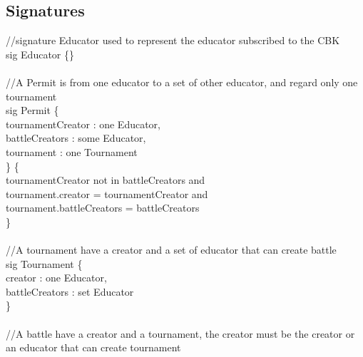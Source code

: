 \documentclass{article}
\begin{document}
{\newpage
\pagestyle{EffortSpentStyle}


\subsection{Signatures}
\color{gray}
//signature Educator used to represent the educator subscribed to the CBK  \\
\color{blue}
sig
\color{black}
Educator  \{\} \\
\\
\color{gray}
//A Permit is from one educator to a set of other educator, and regard only one tournament\\
\color{blue}
sig
\color{black}
Permit \{\\
\-\hspace{1cm}    tournamentCreator : \color{blue} one \color{black} Educator,\\
\-\hspace{1cm}    battleCreators : \color{blue} some \color{black} Educator,\\
\-\hspace{1cm}    tournament : \color{blue} one \color{black} Tournament\\
\}	\{\\
\-\hspace{1cm}    tournamentCreator \color{blue} not in \color{black} battleCreators \color{blue} and \color{black}\\
\-\hspace{1cm}    tournament.creator \color{blue} = \color{black} tournamentCreator \color{blue} and \color{black}\\
\-\hspace{1cm}    tournament.battleCreators \color{blue} = \color{black} battleCreators\\
\}\\
\\
\color{gray}
//A tournament have a creator and a set of educator that can create battle\\
\color{blue}
sig
\color{black}
Tournament \{ \\
\-\hspace{1cm}    creator : \color{blue} one \color{black} Educator,\\
\-\hspace{1cm}    battleCreators : \color{blue} set \color{black} Educator\\
\}\\
\color{gray}
\\
//A battle have a creator and a tournament, the creator must be the creator or an educator that can create tournament\\
}
\end{document}
